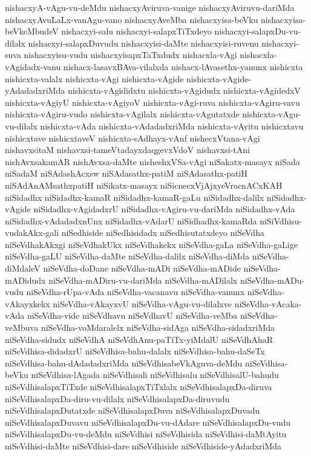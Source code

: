 {nishacxyA-vAgu-vu-deMdu
nishacxyAviruva-vanige
nishacxyAviruvu-dariMda
nishacxyAvuLaLx-vanAgu-vano
nishacxyAveMba
nishacxyisa-beVku
nishacxyisa-beVkeMbudeV
nishacxyi-salu
nishacxyi-salapxTiTxdeyo
nishacxyi-salapxDu-vu-dilalx
nishacxyi-salapxDuvudu
nishacxyisi-daMte
nishacxyisi-ruvenu
nishacxyi-suva
nishacxyisu-vudu
nishacxyisapxTaTxdudx
nishacxla-vAgi
nishacxla-vAgidadx-vanu
nishacx-lasavxBAva-vilalxda
nishacx-lAvasethx-yanunx
nishicxta
nishicxta-valalx
nishicxta-vAgi
nishicxta-vAgide
nishicxta-vAgide-yAdadadxriMda
nishicxta-vAgididxtu
nishicxta-vAgidudx
nishicxta-vAgidedxV
nishicxta-vAgiyU
nishicxta-vAgiyoV
nishicxta-vAgi-ruva
nishicxta-vAgiru-vavu
nishicxta-vAgiru-vudo
nishicxta-vAgilalx
nishicxta-vAgutatxde
nishicxta-vAgu-vu-dilalx
nishicxta-vAda
nishicxta-vAdadadxriMda
nishicxta-vAyitu
nishicxtavu
nishicxtave
nishicxtaveV
nishicxta-sAdhayx-vAnf
nishecxVtana-vAgi
nishavxsitaM
nishavxsi-tameVtadayxdaqgevxVdoV
nishavxsi-tAni
nishAvxsakamAR
nishAvxsa-daMte
nisheshxVSa-vAgi
niSakatx-masayx
niSada
niSadaM
niSAdashAcxsw
niSAdasathx-patiM
niSAdasathx-patiH
niSAdAnAMsathxpatiH
niSikatx-masayx
niSicnecxVjAjxyeVracnACxKAH
niSidadhx
niSidadhx-kamaR
niSidadhx-kamaR-gaLu
niSidadhx-dalilx
niSidadhx-vAgide
niSidadhx-vAgidadxrU
niSidadhx-vAgiru-vu-dariMda
niSidadhx-vAda
niSidadhx-vAdadadxnUnx
niSidadhx-vAdarU
niSidhadhx-kamaRda
niSiVdhisu-vudakAkx-gali
niSedhiside
niSedhisidadx
niSedhisutatxdeyo
niSeVdha
niSeVdhakAkxgi
niSeVdhakUkx
niSeVdhakekx
niSeVdha-gaLa
niSeVdha-gaLige
niSeVdha-gaLU
niSeVdha-daMte
niSeVdha-dalilx
niSeVdha-diMda
niSeVdha-diMdaleV
niSeVdha-doDane
niSeVdha-mADi
niSeVdha-mADide
niSeVdha-mADidudx
niSeVdha-mADiru-vu-dariMda
niSeVdha-mADilalx
niSeVdha-mADu-vudu
niSeVdha-rUpa-vAda
niSeVdha-vacanavu
niSeVdha-vanunx
niSeVdha-vAkayxkekx
niSeVdha-vAkayxvU
niSeVdha-vAgu-vu-dilalxve
niSeVdha-vAcaka-vAda
niSeVdha-vide
niSeVdhavu
niSeVdhavU
niSeVdha-veMba
niSeVdha-veMbuva
niSeVdha-voMdaralelx
niSeVdha-sidAga
niSeVdha-sidadxriMda
niSeVdha-sidudx
niSeVdhA
niSeVdhAnu-paTiTx-yiMdalU
niSeVdhAhaR
niSeVdhisa-didadxrU
niSeVdhisa-bahu-dalalx
niSeVdhisa-bahu-daSeTx
niSeVdhisa-bahu-dAdadadxriMda
niSeVdhisabeVkAguva-deMdu
niSeVdhisa-beVku
niSeVdhisa-lAgada
niSeVdhisali
niSeVdhisalu
niSeVdhisalU-bahudu
niSeVdhisalapxTiTxde
niSeVdhisalapxTiTxlalx
niSeVdhisalapxDa-diruva
niSeVdhisalapxDa-diru-vu-dilalx
niSeVdhisalapxDa-diruvudu
niSeVdhisalapxDutatxde
niSeVdhisalapxDuva
niSeVdhisalapxDuvadu
niSeVdhisalapxDuvavu
niSeVdhisalapxDu-vu-dAdare
niSeVdhisalapxDu-vudu
niSeVdhisalapxDu-vu-deMdu
niSeVdhisi
niSeVdhisida
niSeVdhisi-daMtAyitu
niSeVdhisi-daMte
niSeVdhisi-dare
niSeVdhiside
niSeVdhiside-yAdadxriMda
}
